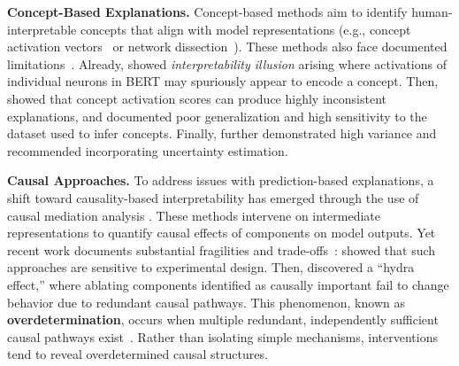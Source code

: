 \medskip
\noindent\textbf{Concept-Based Explanations.}
Concept-based methods \citep{kim2018interpretability,bau2017network} aim to identify human-interpretable concepts that align with model representations (e.g., concept activation vectors~\citep{kim2018interpretability} or network dissection~\citep{bau2017network}). These methods also face documented limitations~\citep{sinha2025comprehensivesurveyriskslimitations,aysel2025conceptbasedexplainableartificialintelligence}. Already, \citet{bolukbasi2021interpretabilityillusionbert} showed \textit{interpretability illusion} arising where activations of individual neurons in BERT may spuriously appear to encode a concept. Then, \citet{nicolson2025explainingexplainabilityrecommendationseffective} showed that concept activation scores can produce highly inconsistent explanations, and \citet{ramaswamy2023overlooked} documented poor generalization and high sensitivity to the dataset used to infer concepts. Finally, \citet{piratla2024estimationconceptexplanationsuncertainty} further demonstrated high variance and recommended incorporating uncertainty estimation.


\medskip
\noindent\textbf{Causal Approaches.}
To address issues with prediction-based explanations, a shift toward causality-based interpretability has emerged through the use of causal mediation analysis \citep{pearl2012causal,elazar-etal-2021-amnesic,NEURIPS2020_92650b2e,meng2022locating,finlayson-etal-2021-causal,syed2023attribution,monea2024glitchmatrixlocatingdetecting,mueller2024questrightmediatorhistory}. These methods intervene on intermediate representations to quantify causal effects of components on model outputs. 
Yet recent work documents substantial fragilities and trade-offs~\citep{canby2025reliablecausalprobinginterventions}: \citet{zhang2024bestpracticesactivationpatching} showed that such approaches are sensitive to experimental design. Then, \citet{mcgrath2023hydraeffectemergentselfrepair} discovered a ``hydra effect,'' where ablating components identified as causally important fail to change behavior due to redundant causal pathways. This phenomenon, known as \textbf{overdetermination}, occurs when multiple redundant, independently sufficient causal pathways exist~\citep{schaffer2003overdetermining,sider2003s,Dyrkolbotn_2017}. Rather than isolating simple mechanisms, interventions tend to reveal overdetermined causal structures.
 
